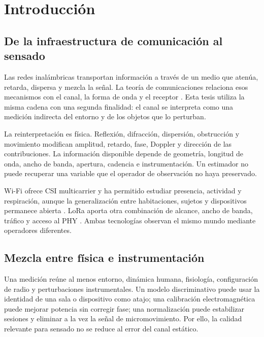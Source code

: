 \chapter{Introducción}
\label{ch:introduccion}

\section{De la infraestructura de comunicación al sensado}

Las redes inalámbricas transportan información a través de un medio que atenúa, retarda, dispersa y mezcla la señal. La teoría de comunicaciones relaciona esos mecanismos con el canal, la forma de onda y el receptor \citep{Molisch2022,TseViswanath2005,Goldsmith2005}. Esta tesis utiliza la misma cadena con una segunda finalidad: el canal se interpreta como una medición indirecta del entorno y de los objetos que lo perturban.

La reinterpretación es física. Reflexión, difracción, dispersión, obstrucción y movimiento modifican amplitud, retardo, fase, Doppler y dirección de las contribuciones. La información disponible depende de geometría, longitud de onda, ancho de banda, apertura, cadencia e instrumentación. Un estimador no puede recuperar una variable que el operador de observación no haya preservado.

Wi-Fi ofrece CSI multicarrier y ha permitido estudiar presencia, actividad y respiración, aunque la generalización entre habitaciones, sujetos y dispositivos permanece abierta \citep{Zhu2024Survey,Armenta2024Survey}. LoRa aporta otra combinación de alcance, ancho de banda, tráfico y acceso al PHY \citep{Zhang2020LoRa,SenLoRa2025,Xue2025LargeScaleLoRa}. Ambas tecnologías observan el mismo mundo mediante operadores diferentes.

\section{Mezcla entre física e instrumentación}

Una medición reúne al menos entorno, dinámica humana, fisiología, configuración de radio y perturbaciones instrumentales. Un modelo discriminativo puede usar la identidad de una sala o dispositivo como atajo; una calibración electromagnética puede mejorar potencia sin corregir fase; una normalización puede estabilizar sesiones y eliminar a la vez la señal de micromovimiento. Por ello, la calidad relevante para sensado no se reduce al error del canal estático.


